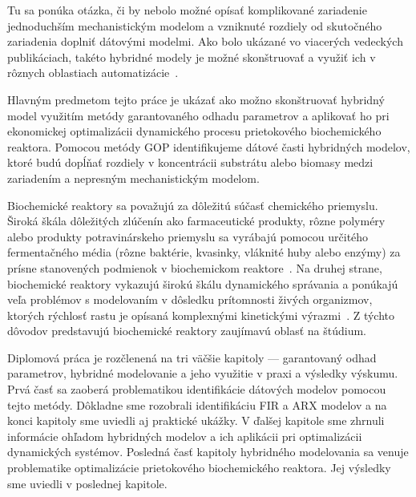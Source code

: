 Tu sa ponúka otázka, či by nebolo možné opísať komplikované zariadenie jednoduchším mechanistickým modelom a vzniknuté rozdiely od skutočného zariadenia doplniť dátovými modelmi. Ako bolo ukázané vo viacerých vedeckých publikáciach, takéto hybridné modely je možné skonštruovať a využiť ich v rôznych oblastiach automatizácie~\cite{hamilton:hybrid_modeling:2017, hernandez:economics_opt_w_mismatch:2019}.

Hlavným predmetom tejto práce je ukázať ako možno skonštruovať hybridný model využitím metódy garantovaného odhadu parametrov a aplikovať ho pri ekonomickej optimalizácii dynamického procesu prietokového biochemického reaktora. Pomocou metódy GOP identifikujeme dátové časti hybridných modelov, ktoré budú dopĺňať rozdiely v koncentrácii substrátu alebo biomasy medzi zariadením a nepresným mechanistickým modelom.

Biochemické reaktory sa považujú za dôležitú súčasť chemického priemyslu. Široká škála dôležitých zlúčenín ako farmaceutické produkty, rôzne polyméry alebo produkty potravinárskeho priemyslu sa vyrábajú pomocou určitého fermentačného média (rôzne baktérie, kvasinky, vláknité huby alebo enzýmy) za prísne stanovených podmienok v biochemickom reaktore~\cite{srinivasan:chemostat_opt:2003}. Na druhej strane, biochemické reaktory vykazujú širokú škálu dynamického správania a ponúkajú veľa problémov s modelovaním v dôsledku prítomnosti živých organizmov, ktorých rýchlosť rastu je opísaná komplexnými kinetickými výrazmi~\cite{psichogios:hybrid_process_model:1992}. Z týchto dôvodov predstavujú biochemické reaktory zaujímavú oblasť na štúdium.

Diplomová práca je rozčlenená na tri väčšie kapitoly --- garantovaný odhad parametrov, hybridné modelovanie a jeho využitie v praxi a výsledky výskumu. Prvá časť sa zaoberá problematikou identifikácie dátových modelov pomocou tejto metódy. Dôkladne sme rozobrali identifikáciu FIR a ARX modelov a na konci kapitoly sme uviedli aj praktické ukážky. V ďalšej kapitole sme zhrnuli informácie ohľadom hybridných modelov a ich aplikácii pri optimalizácii dynamických systémov. Posledná časť kapitoly hybridného modelovania sa venuje problematike optimalizácie prietokového biochemického reaktora. Jej výsledky sme uviedli v poslednej kapitole.